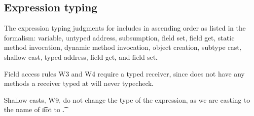 \documentclass[a4paper,USenglish]{tex/lipics-v2016}
\begin{document}
\begin{mathpar}
\end{mathpar}


\subsection{Expression typing}

The expression typing judgments for \kafka includes in ascending order as listed in the formalism:
variable, untyped address, subsumption, field set, field get, static method invocation, dynamic method invocation, object creation,
subtype cast, shallow cast, typed address,  field get, and  field set.

Field access rules W3 and W4 require a typed receiver, since \any does not
have any methods a receiver typed at \any will never typecheck.

Shallow casts, W9, do not change the type of the expression, as we are casting
to the name of \t not to \t.  

~\\
\end{document}
